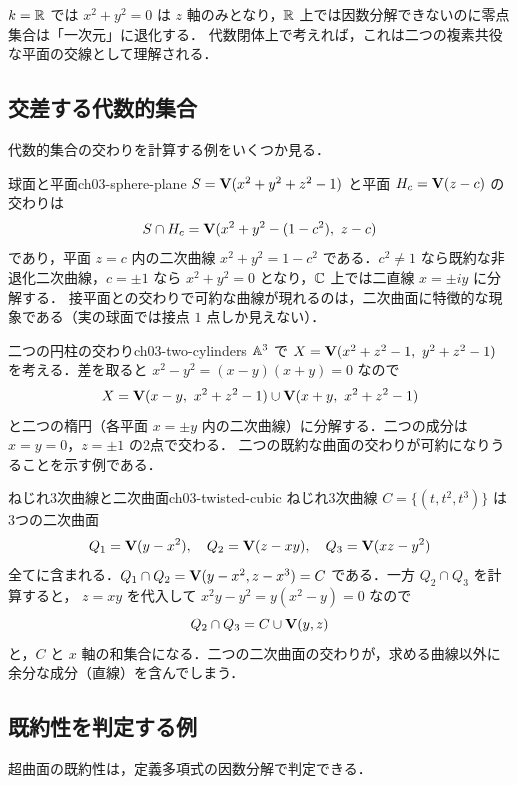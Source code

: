 \begin{note}
$k=\mathbb{R}$ では $x^2+y^2=0$ は $z$ 軸のみとなり，$\mathbb{R}$ 上では因数分解できないのに零点集合は「一次元」に退化する．
代数閉体上で考えれば，これは二つの複素共役な平面の交線として理解される．
\end{note}

\subsection{交差する代数的集合}

代数的集合の交わりを計算する例をいくつか見る．

\begin{myex}{球面と平面}{ch03-sphere-plane}
$S=\mathbf{V}(x^2+y^2+z^2-1)$ と平面 $H_c=\mathbf{V}(z-c)$ の交わりは
\[
  S\cap H_c=\mathbf{V}(x^2+y^2-(1-c^2),\ z-c)
\]
であり，平面 $z=c$ 内の二次曲線 $x^2+y^2=1-c^2$ である．$c^2\ne1$ なら既約な非退化二次曲線，$c=\pm1$ なら $x^2+y^2=0$ となり，$\mathbb{C}$ 上では二直線 $x=\pm iy$ に分解する．
接平面との交わりで可約な曲線が現れるのは，二次曲面に特徴的な現象である（実の球面では接点 $1$ 点しか見えない）．
\end{myex}

\begin{myex}{二つの円柱の交わり}{ch03-two-cylinders}
$\mathbb{A}^3$ で $X=\mathbf{V}(x^2+z^2-1,\ y^2+z^2-1)$ を考える．差を取ると $x^2-y^2=(x-y)(x+y)=0$ なので
\[
  X=\Zero(x-y,\ x^2+z^2-1)\cup\Zero(x+y,\ x^2+z^2-1)
\]
と二つの楕円（各平面 $x=\pm y$ 内の二次曲線）に分解する．二つの成分は $x=y=0$，$z=\pm1$ の2点で交わる．
二つの既約な曲面の交わりが可約になりうることを示す例である．
\end{myex}

\begin{myex}{ねじれ3次曲線と二次曲面}{ch03-twisted-cubic}
ねじれ3次曲線 $C=\{(t,t^2,t^3)\}$ は3つの二次曲面
\[
  Q_1=\mathbf{V}(y-x^2),\quad Q_2=\mathbf{V}(z-xy),\quad Q_3=\mathbf{V}(xz-y^2)
\]
全てに含まれる．$Q_1\cap Q_2=\mathbf{V}(y-x^2,z-x^3)=C$ である．一方 $Q_2\cap Q_3$ を計算すると，
$z=xy$ を代入して $x^2y-y^2=y(x^2-y)=0$ なので
\[
  Q_2\cap Q_3=C\cup\mathbf{V}(y,z)
\]
と，$C$ と $x$ 軸の和集合になる．二つの二次曲面の交わりが，求める曲線以外に余分な成分（直線）を含んでしまう．
\end{myex}

\subsection{既約性を判定する例}
\label{subsec:ch03-irred-test}

超曲面の既約性は，定義多項式の因数分解で判定できる．


